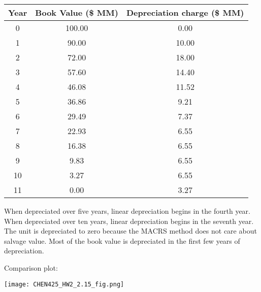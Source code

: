 \documentclass[12pt]{article}
\begin{document}
\begin{enumerate}
    \begin{tabular}{|c|c|c|}
        \hline
        Year & Book Value (\$ MM) & Depreciation charge (\$ MM) \\
        \hline
        0 & 100.00 & 0.00 \\
        1 & 90.00 & 10.00 \\
        2 & 72.00 & 18.00 \\
        3 & 57.60 & 14.40 \\
        4 & 46.08 & 11.52 \\
        5 & 36.86 & 9.21 \\
        6 & 29.49 & 7.37 \\
        7 & 22.93 & 6.55 \\
        8 & 16.38 & 6.55 \\
        9 & 9.83 & 6.55	\\
        10 & 3.27 & 6.55 \\
        11 & 0.00 & 3.27 \\
        \hline
    \end{tabular}

    When depreciated over five years, linear depreciation begins in the fourth year. When depreciated over ten years, linear depreciation begins in the seventh year. The unit is depreciated to zero because the MACRS method does not care about salvage value. Most of the book value is depreciated in the first few years of depreciation.

    \newpage
    Comparison plot:

    \texttt{[image: CHEN425\_HW2\_2.15\_fig.png]}


\end{enumerate}
\end{document}
